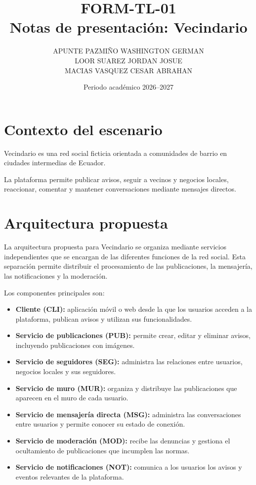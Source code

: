 \documentclass[12pt,a4paper]{article}
\title{FORM-TL-01\\
Notas de presentación: Vecindario}
\author{
APUNTE PAZMIÑO WASHINGTON GERMAN\\
LOOR SUAREZ JORDAN JOSUE\\
MACIAS VASQUEZ CESAR ABRAHAN
}
\date{Periodo académico 2026--2027}
\begin{document}
\maketitle

\section{Contexto del escenario}

Vecindario es una red social ficticia orientada a comunidades
de barrio en ciudades intermedias de Ecuador.

La plataforma permite publicar avisos, seguir a vecinos y
negocios locales, reaccionar, comentar y mantener conversaciones
mediante mensajes directos.

\section{Arquitectura propuesta}

La arquitectura propuesta para Vecindario se organiza mediante servicios independientes que se encargan de las diferentes funciones de la red social. Esta separación permite distribuir el procesamiento de las publicaciones, la mensajería, las notificaciones y la moderación.

Los componentes principales son:

\begin{itemize}
    \item \textbf{Cliente (CLI):} aplicación móvil o web desde la que los usuarios acceden a la plataforma, publican avisos y utilizan sus funcionalidades.

    \item \textbf{Servicio de publicaciones (PUB):} permite crear, editar y eliminar avisos, incluyendo publicaciones con imágenes.

    \item \textbf{Servicio de seguidores (SEG):} administra las relaciones entre usuarios, negocios locales y sus seguidores.

    \item \textbf{Servicio de muro (MUR):} organiza y distribuye las publicaciones que aparecen en el muro de cada usuario.

    \item \textbf{Servicio de mensajería directa (MSG):} administra las conversaciones entre usuarios y permite conocer su estado de conexión.

    \item \textbf{Servicio de moderación (MOD):} recibe las denuncias y gestiona el ocultamiento de publicaciones que incumplen las normas.

    \item \textbf{Servicio de notificaciones (NOT):} comunica a los usuarios los avisos y eventos relevantes de la plataforma.
\end{itemize}
\end{document}
